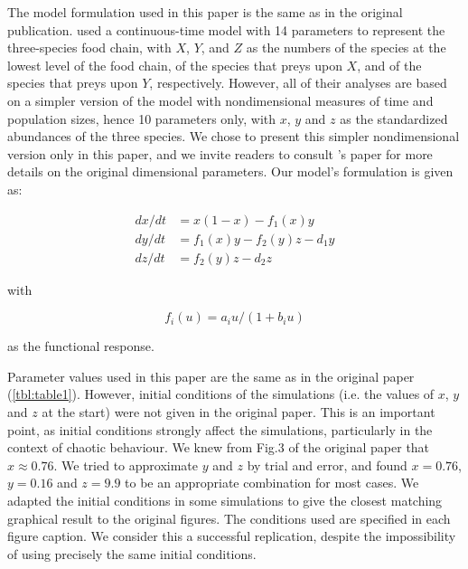 The model formulation used in this paper is the same as in the original
publication. \citeauthor{hastings1991} used a continuous-time model with 14 parameters to represent the three-species
food chain, with $X$, $Y$, and $Z$ as the numbers of the species at the lowest level of
the food chain, of the species that preys upon $X$, and of the species that preys upon
$Y$, respectively.
However, all of their analyses are based on a simpler version of the model with
nondimensional measures of time and population sizes, hence 10 parameters only, with $x$,
$y$ and $z$ as the standardized abundances of the three species.
We chose to present this simpler nondimensional version only in this paper, and we invite
readers to consult \citeauthor{hastings1991}'s paper for more details on the original dimensional
parameters. Our model's formulation is given as:

\begin{equation} \label{eq:1}
  \begin{align}
    dx/dt &= x(1 - x) - f_1(x)y \\
    dy/dt &= f_1(x)y - f_2(y)z - d_1y \\
    dz/dt &= f_2(y)z - d_2z
  \end{align}
\end{equation}

with

\begin{equation} \label{eq:2}
    f_i(u) = a_iu/(1 + b_iu)
\end{equation}

as the functional response.

Parameter values used in this paper are the same as in the original paper
(\autoref{tbl:table1}). However, initial conditions of the simulations (i.e. the values of $x$,
$y$ and $z$ at the start) were not given in the original paper.
This is an important point, as initial conditions strongly affect the simulations,
particularly in the context of chaotic behaviour.
We knew from Fig.3 of the original paper that $x \approx 0.76$.
We tried to approximate $y$ and $z$ by trial and error, and found $x = 0.76$, $y = 0.16$ and
$z = 9.9$ to be an appropriate combination for most cases.
We adapted the initial conditions in some simulations to give the closest matching
graphical result to the original figures.
The conditions used are specified in each figure caption.
We consider this a successful replication, despite the impossibility of using precisely
the same initial conditions.

